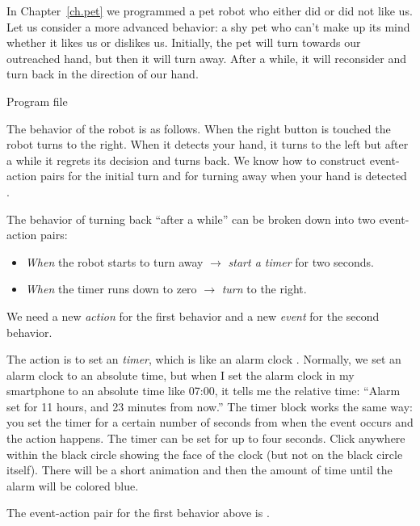 
In Chapter~\ref{ch.pet} we programmed a pet robot who either did or did
not like us. Let us consider a more advanced behavior: a shy pet who
can't make up its mind whether it likes us or dislikes us. Initially,
the pet will turn towards our outreached hand, but then it will turn
away. After a while, it will reconsider and turn back in the direction
of our hand.

{\raggedleft \hfill Program file }

The behavior of the robot is as follows. When the right button is
touched the robot turns to the right. When it detects your hand, it
turns to the left but after a while it regrets its decision and turns
back. We know how to construct event-action pairs for the initial turn
 and for turning away when your hand is detected
.

The behavior of turning back ``after a while'' can be broken down into
two event-action pairs:

\begin{itemize}

\item \emph{When} the robot starts to turn away $\rightarrow$
\emph{start a timer} for two seconds.

\item \emph{When} the timer runs down to zero $\rightarrow$ \emph{turn}
to the right.

\end{itemize}

We need a new \emph{action} for the first behavior and a new
\emph{event} for the second behavior.

The action is to set an \emph{timer}, which is like an alarm clock
. Normally, we set an alarm clock to an absolute time,
but when I set the alarm clock in my smartphone to an absolute time like
07:00, it tells me the relative time: ``Alarm set for 11 hours, and 23
minutes from now.'' The timer block works the same way: you set the
timer for a certain number of seconds from when the event occurs and the
action happens. The timer can be set for up to four seconds. Click
anywhere within the black circle showing the face of the clock (but not
on the black circle itself). There will be a short animation and then
the amount of time until the alarm will be colored blue.

The event-action pair for the first behavior above is
.

